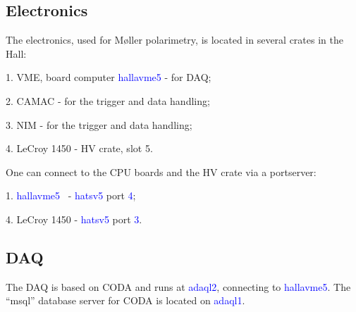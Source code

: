 {\subsection {Electronics}
\label{sec:moller_compon_ele}

The electronics, used for M{\o}ller polarimetry, is located
in several crates in the Hall:
\begin{list}{}{\setlength{\itemsep}{-0.15cm}}
  \item[1.] VME, board computer \textcolor{blue}{hallavme5} - for DAQ;
  \item[2.] CAMAC - for the trigger and data handling;
  \item[3.] NIM - for the trigger and data handling;
  \item[4.] LeCroy 1450 - HV crate, slot 5.
\end{list}
\noindent
{}
\noindent
One can connect to the CPU boards and the HV crate via a portserver:
\begin{list}{}{\setlength{\itemsep}{-0.15cm}}
  \item[1.] \textcolor{blue}{hallavme5}~ - \textcolor{blue}{hatsv5} port \textcolor{blue}{4};
  \item[4.] LeCroy 1450 - \textcolor{blue}{hatsv5} port \textcolor{blue}{3}.
\end{list}

\subsection {DAQ}
\label{sec:moller_compon_daq}

The DAQ%
 is based on CODA\cite{CODAwww} and runs at \textcolor{blue}{adaql2},
connecting to \textcolor{blue}{hallavme5}. The ``msql'' database server for CODA
is located on \textcolor{blue}{adaql1}. 

}
